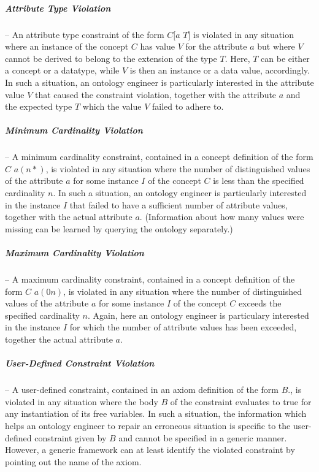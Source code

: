    \subparagraph{Attribute Type Violation} -- An attribute type
    constraint of the form $C[a$  $T]$ is violated in
    any situation where an instance of the concept $C$ has value
    $V$ for the attribute $a$ but where $V$ cannot be derived to
    belong to the extension of the type $T$. Here, $T$ can be
    either a concept or a datatype, while $V$ is then an instance
    or a data value, accordingly. In such a situation, an ontology
    engineer is particularly interested in the attribute value $V$
    that caused the constraint violation, together with the
    attribute $a$ and the expected type $T$ which the value $V$
    failed to adhere to.

    \subparagraph{Minimum Cardinality Violation} -- A minimum
    cardinality constraint, contained in a concept definition of
    the form  $C$ $a (n *)$, is violated in any
    situation where the number of distinguished values of the
    attribute $a$ for some instance $I$ of the concept $C$ is less
    than the specified cardinality $n$. In such a situation, an
    ontology engineer is particularly interested in the instance
    $I$ that failed to have a sufficient number of attribute
    values, together with the actual attribute $a$. (Information about
    how many values were missing can be learned by querying the
    ontology separately.)

    \subparagraph{Maximum Cardinality Violation} -- A maximum
    cardinality constraint, contained in a concept definition of
    the form  $C$ $a (0 n)$, is violated in any
    situation where the number of distinguished values of the
    attribute $a$ for some instance $I$ of the concept $C$ exceeds
    the specified cardinality $n$. Again, here an ontology
    engineer is particulary interested in the instance $I$ for which
    the number of attribute values has been exceeded, together the
    actual attribute $a$.

    \subparagraph{User-Defined Constraint Violation} -- A
    user-defined constraint, contained in an axiom definition of
    the form  \axiomid {} $B.$, is
    violated in any situation where the body $B$ of the constraint
    evaluates to true for any instantiation of its free variables.
    In such a situation, the information which helps an ontology
    engineer to repair an erroneous situation is specific to the user-defined
    constraint given by $B$ and cannot be specified in a generic
    manner. However, a generic framework can at least identify the
    violated constraint by pointing out the name \axiomid of the axiom.



